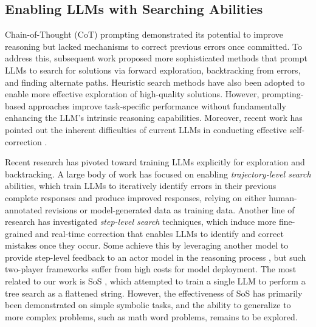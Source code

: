 \subsection{Enabling LLMs with Searching Abilities}
Chain-of-Thought (CoT) prompting \cite{wei2022chain} demonstrated its potential to improve reasoning but lacked mechanisms to correct previous errors once committed. To address this, subsequent work proposed more sophisticated methods \cite{yao2024tree, shinn2024reflexion, besta2024graph, selfrefine, yang2024buffer} that prompt LLMs to search for solutions via forward exploration, backtracking from errors, and finding alternate paths. Heuristic search methods \cite{hao2023reasoning, qi2024mutual} have also been adopted to enable more effective exploration of high-quality solutions. However, prompting-based approaches improve task-specific performance without fundamentally enhancing the LLM's intrinsic reasoning capabilities. Moreover, recent work has pointed out the inherent difficulties of current LLMs in conducting effective self-correction \cite{huang2023large, zhang2024small, kamoi2024can}.

Recent research has pivoted toward training LLMs explicitly for exploration and backtracking. A large body of work has focused on enabling \textit{trajectory-level search} abilities, which train LLMs to iteratively identify errors in their previous complete responses and produce improved responses, relying on either human-annotated revisions \cite{saunders2022self} or model-generated data \cite{kumar2024training, qu2024recursive, havrilla2024glore} as training data. Another line of research has investigated \textit{step-level search} techniques, which induce more fine-grained and real-time correction that enables LLMs to identify and correct mistakes once they occur. Some achieve this by leveraging another model to provide step-level feedback to an actor model in the reasoning process \cite{xi2024enhancing, welleck2022generating, paul2023refiner, llamaberry, rewardingprogress, generativeverifiers, rstarmath, restmcts}, but such two-player frameworks suffer from high costs for model deployment. The most related to our work is SoS \cite{gandhi2024stream}, which attempted to train a single LLM to perform a tree search as a flattened string. However, the effectiveness of SoS has primarily been demonstrated on simple symbolic tasks, and the ability to generalize to more complex problems, such as math word problems, remains to be explored. 

